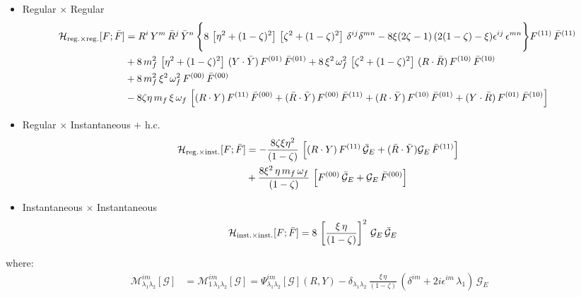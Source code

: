 \documentclass[9pt]{article}
\numberwithin{equation}{section}
\begin{document}
\begin{itemize}
    \item Regular $\times$ Regular
    \begin{align}
        \mathcal{H}_{\mathrm{reg.}\times \mathrm{reg.}}[F;\Bar{F}] & = R^{i}\,Y^{m}\,\Bar{R}^{j}\,\Bar{Y}^{n}\,\Bigg\{8\,\left[\eta^{2}+(1-\zeta)^{2}\right]\,\left[\zeta^{2} + (1-\zeta)^{2}\right]\,\delta^{ij}\delta^{mn}-8\xi(2\zeta - 1)\, (2(1-\zeta)-\xi)\epsilon^{ij}\,\epsilon^{mn}\Bigg\}F^{(11)}\,\Bar{F}^{(11)}\notag \\ & +8\,m^{2}_{f}\,\left[\eta^{2} + (1-\zeta)^{2}\right]\, (Y\cdot \Bar{Y})\,F^{(01)}\,\Bar{F}^{(01)}+8\,\xi^{2}\,\omega^{2}_{f}\,\left[\zeta^{2}+(1-\zeta)^{2}\right]\, (R\cdot \Bar{R})\, F^{(10)}\,\Bar{F}^{(10)}\notag \\ & + 8\,m^{2}_{f}\,\xi^{2}\,\omega^{2}_{f}\,F^{(00)}\,\Bar{F}^{(00)}\notag \\ & -8\zeta\eta\, m_{f}\,\xi\,\omega_{f}\, \left[(R\cdot Y)\,F^{(11)}\,\Bar{F}^{(00)} + (\Bar{R}\cdot \Bar{Y})\,F^{(00)}\,\Bar{F}^{(11)} + (R\cdot \Bar{Y})\,F^{(10)}\,\Bar{F}^{(01)} + (Y\cdot \Bar{R})\,F^{(01)}\,\Bar{F}^{(10)}\right]
    \end{align}
    \item Regular $\times$ Instantaneous $+$ h.c.
    \begin{align}
        \mathcal{H}_{\mathrm{reg.}\times \mathrm{inst.}}[F;\Bar{F}] & = -\frac{8\zeta\xi\eta^{2}}{(1-\zeta)}\, \left[(R\cdot Y)\,F^{(11)}\,\mathcal{\Bar{G}}_{E} + (\Bar{R}\cdot \Bar{Y})\mathcal{G}_{E}\,\Bar{F}^{(11)}\right]\notag \\ & +\frac{8\xi^{2}\,\eta\,m_{f}\,\omega_{f}}{(1-\zeta)}\,\left[F^{(00)}\,\mathcal{\Bar{G}}_{E} + \mathcal{G}_{E}\,\Bar{F}^{(00)}\right]
    \end{align}
    \item Instantaneous $\times$ Instantaneous
    \begin{align}
       \mathcal{H}_{\mathrm{inst.}\times \mathrm{inst.}}[F;\Bar{F}] & = 8\,\left[\frac{\xi\,\eta}{(1-\zeta)}\right]^{2}\, \mathcal{G}_{E}\, \mathcal{\Bar{G}}_{E}
    \end{align}
\end{itemize}
where: 
\begin{align}
\mathcal{M}^{im}_{\lambda_{1}\lambda_{2}} [\mathcal{G}] & = \mathcal{M}^{im}_{1\,\lambda_{1}\lambda_{2}} [\mathcal{G}] = \Psi^{im}_{\lambda_{1}\lambda_{2}}[\mathcal{G}](R,Y) - \delta_{\lambda_{1}\lambda_{2}}\,\frac{\xi\,\eta}{(1-\zeta)}\,\left(\delta^{im}+2i\epsilon^{im}\,\lambda_{1}\right)\,\mathcal{G}_{E}
\end{align}
\end{document}
